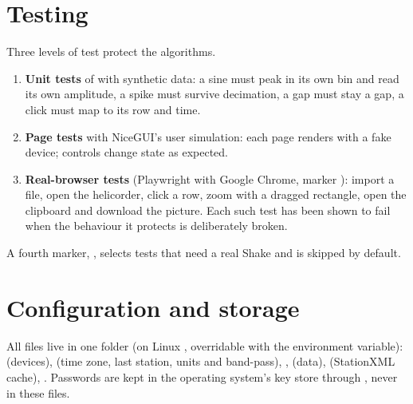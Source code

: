 \section{Testing}
Three levels of test protect the algorithms.
\begin{enumerate}
\item \textbf{Unit tests} of  with synthetic data: a sine must peak in its own bin and read its own amplitude, a
  spike must survive decimation, a gap must stay a gap, a click must map to its row and time.
\item \textbf{Page tests} with NiceGUI's user simulation: each page renders with a fake device; controls change state as
  expected.
\item \textbf{Real-browser tests} (Playwright with Google Chrome, marker ): import a file, open the helicorder, click
  a row, zoom with a dragged rectangle, open the clipboard and download the picture. Each such test has been shown to fail when
  the behaviour it protects is deliberately broken.
\end{enumerate}
A fourth marker, , selects tests that need a real Shake and is skipped by default.

\section{Configuration and storage}
All files live in one folder (on Linux , overridable with the
 environment variable):  (devices),  (time zone, last station,
units and band-pass), ,  (data),  (StationXML cache), . Passwords
are kept in the operating system's key store through , never in these files.
